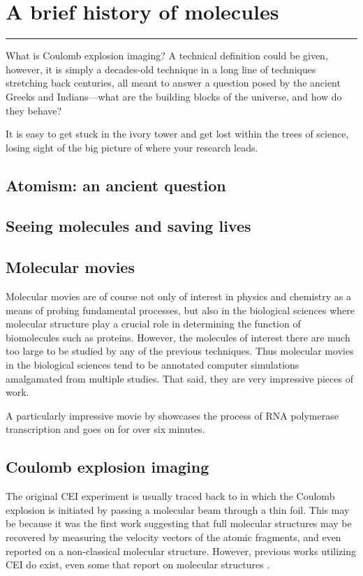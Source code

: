 \chapter{A brief history of molecules}\label{ch:history}

\vspace{-1.5 em}
\minitoc\hrule
\vspace{1.5 em}

What is Coulomb explosion imaging? A technical definition could be given, however, it is simply a decades-old technique in a long line of techniques stretching back centuries, all meant to answer a question posed by the ancient Greeks and Indians---what are the building blocks of the universe, and how do they behave?

It is easy to get stuck in the ivory tower and get lost within the trees of science, losing sight of the big picture of where your research leads.

\section{Atomism: an ancient question}

\section{Seeing molecules and saving lives}

\section{Molecular movies}
Molecular movies are of course not only of interest in physics and chemistry as a means of probing fundamental processes, but also in the biological sciences where molecular structure play a crucial role in determining the function of biomolecules such as proteins. However, the molecules of interest there are much too large to be studied by any of the previous techniques. Thus molecular movies in the biological sciences tend to be annotated computer simulations amalgamated from multiple studies. That said, they are very impressive pieces of work.

A particularly impressive movie by \citet{Cheung12} showcases the process of RNA polymerase transcription and goes on for over six minutes.

\section{Coulomb explosion imaging}
The original CEI experiment is usually traced back to \citet{Vager89} in which the Coulomb explosion is initiated by passing a molecular beam through a thin foil. This may be because it was the first work suggesting that full molecular structures may be recovered by measuring the velocity vectors of the atomic fragments, and even reported on a non-classical molecular structure. However, previous works utilizing CEI do exist, even some that report on molecular structures \citep{Kanter79}.

